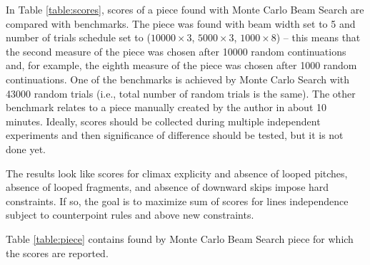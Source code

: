 \documentclass{article}
\begin{document}
In Table \ref{table:scores}, scores of a piece found with Monte Carlo Beam Search are compared with benchmarks. The piece was found with beam width set to 5 and number of trials schedule set to ($10000 \times 3$, $5000 \times 3$, $1000 \times 8$) -- this means that the second measure of the piece was chosen after 10000 random continuations and, for example, the eighth measure of the piece was chosen after 1000 random continuations. One of the benchmarks is achieved by Monte Carlo Search with 43000 random trials (i.e., total number of random trials is the same). The other benchmark relates to a piece manually created by the author in about 10 minutes. Ideally, scores should be collected during multiple independent experiments and then significance of difference should be tested, but it is not done yet.

The results look like scores for climax explicity and absence of looped pitches, absence of looped fragments, and absence of downward skips impose hard constraints. If so, the goal is to maximize sum of scores for lines independence subject to counterpoint rules and above new constraints.

Table \ref{table:piece} contains found by Monte Carlo Beam Search piece for which the scores are reported.
\end{document}
